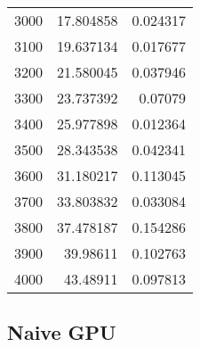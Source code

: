 \begin{longtable}{r r r}
3000 & 17.804858 & 0.024317 \\
3100 & 19.637134 & 0.017677 \\
3200 & 21.580045 & 0.037946 \\
3300 & 23.737392 & 0.07079 \\
3400 & 25.977898 & 0.012364 \\
3500 & 28.343538 & 0.042341 \\
3600 & 31.180217 & 0.113045 \\
3700 & 33.803832 & 0.033084 \\
3800 & 37.478187 & 0.154286 \\
3900 & 39.98611 & 0.102763 \\
4000 & 43.48911 & 0.097813 \\
\end{longtable}

\subsection*{Naive GPU}

